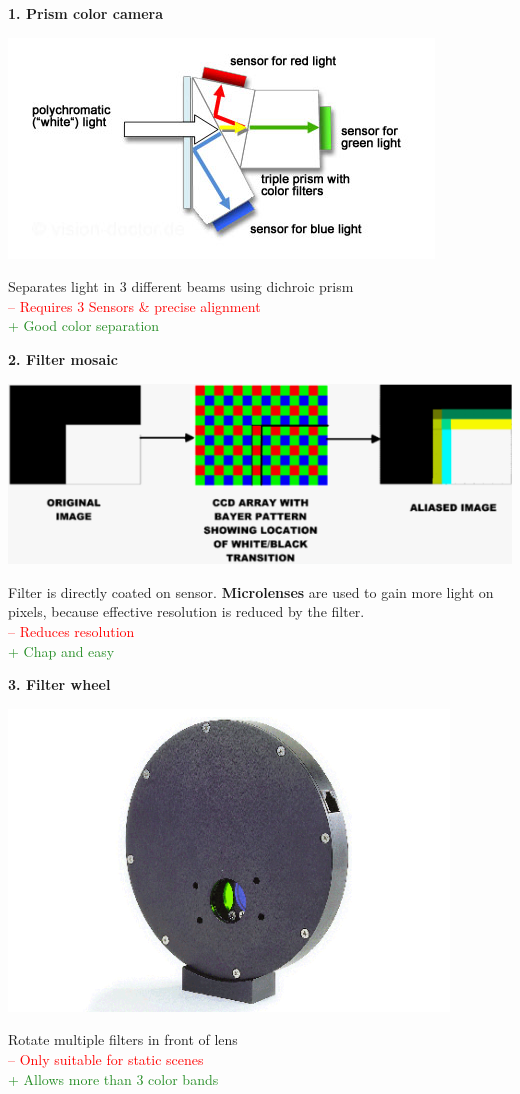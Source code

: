 \documentclass[a4paper, fontsize=8pt, landscape, DIV=1]{scrartcl}
\begin{document}
\begin{multicols*}{4}
		
		\textbf{1. Prism color camera}\\
		\begin{center}
			\includegraphics[width=0.5\columnwidth]{images/ImageAcq/prism_color_camera.png}\\
		\end{center}
		Separates light in 3 different beams using dichroic prism\\ 
		\textcolor{red}{ -- Requires 3 Sensors \& precise alignment}\\
		\textcolor{ForestGreen}{+ Good color separation}
		\par 
		\textbf{2. Filter mosaic}\\
		\vspace{-0.3cm}
		\begin{center}
			\includegraphics[width=0.9\columnwidth]{images/ImageAcq/bayer_filter.png}\\
		\end{center}
		Filter is directly coated on sensor. \textbf{Microlenses} are used to gain more light on pixels, because effective resolution is reduced by the filter.\\
		\textcolor{red}{ -- Reduces resolution}\\
		\textcolor{ForestGreen}{+ Chap and easy}
		\par 
		\textbf{3. Filter wheel}\\
		\begin{center}
			\includegraphics[width=0.6\columnwidth]{images/ImageAcq/filter_wheel.png}\\
		\end{center}
		Rotate multiple filters in front of lens\\
		\textcolor{red}{ -- Only suitable for static scenes}\\
		\textcolor{ForestGreen}{+ Allows more than 3 color bands}
		

\end{multicols*}
\end{document}
